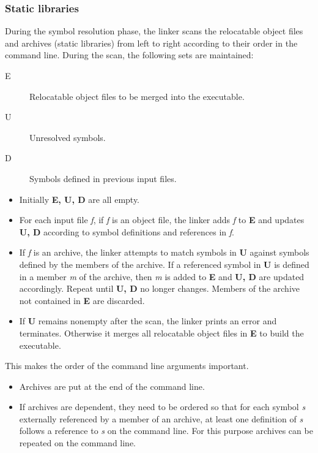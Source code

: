 \subsubsection{Static libraries}
During the symbol resolution phase, the linker scans the relocatable object files and archives (static libraries) from left to right according to their order in the command line. During the scan, the following sets are maintained:
\begin{description}
	\item[E] Relocatable object files to be merged into the executable.
	\item[U] Unresolved symbols.
	\item[D] Symbols defined in previous input files.
\end{description}
\begin{itemize}
\item Initially \textbf{E, U, D} are all empty.
\item For each input file \emph{f}, if \emph{f} is an object file, the linker adds \emph{f} to \textbf{E} and updates \textbf{U, D} according to symbol definitions and references in \emph{f}.
\item If \emph{f} is an archive, the linker attempts to match symbols in \textbf{U} against symbols defined by the members of the archive. If a referenced symbol in \textbf{U} is defined in a member \emph{m} of the archive, then \emph{m} is added to \textbf{E} and \textbf{U, D} are updated accordingly. Repeat until \textbf{U, D} no longer changes. Members of the archive not contained in \textbf{E} are discarded.
\item If \textbf{U} remains nonempty after the scan, the linker prints an error and terminates. Otherwise it merges all relocatable object files in \textbf{E} to build the executable. 
\end{itemize}
This makes the order of the command line arguments important. 
\begin{itemize}
\item Archives are put at the end of the command line.
\item If archives are dependent, they need to be ordered so that for each symbol \emph{s} externally referenced by a member of an archive, at least one definition of \emph{s} follows a reference to \emph{s} on the command line. For this purpose archives can be repeated on the command line.
\end{itemize}
